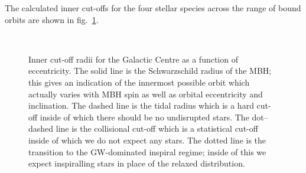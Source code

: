 \documentclass[useAMS,usedcolumn,usegraphicx,usenatbib]{mn2e}
\newcommand{\figref}[1]{fig.~\ref{fig:#1}}
\begin{document}
The calculated inner cut-offs for the four stellar species across the range of bound orbits are shown in \figref{Cuts}.
\begin{figure}
\begin{center}
    \quad 
    \\
    \quad
\caption{Inner cut-off radii for the Galactic Centre as a function of eccentricity. The solid line is the Schwarzschild radius of the MBH; this gives an indication of the innermost possible orbit which actually varies with MBH spin as well as orbital eccentricity and inclination. The dashed line is the tidal radius which is a hard cut-off inside of which there should be no undisrupted stars. The dot--dashed line is the collisional cut-off which is a statistical cut-off inside of which we do not expect any stars. The dotted line is the transition to the GW-dominated inspiral regime; inside of this we expect inspiralling stars in place of the relaxed distribution.\label{fig:Cuts}}
  \end{center}
\end{figure}
\end{document}
